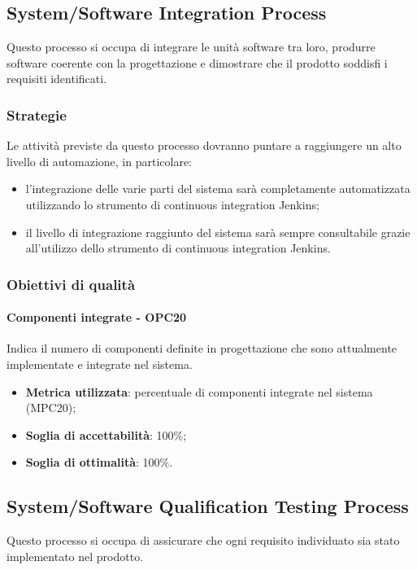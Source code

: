 \documentclass[PianoDiQualifica.tex]{subfiles}
\begin{document}
	\subsection{System/Software Integration Process}
		Questo processo si occupa di integrare le unità software tra loro, produrre software coerente con la progettazione e dimostrare che il
		prodotto soddisfi i requisiti identificati.
		
		\subsubsection{Strategie}
		Le attività previste da questo processo dovranno puntare a raggiungere un alto livello di automazione, in particolare:
		\begin{itemize}
			\item l’integrazione delle varie parti del sistema sarà completamente automatizzata utilizzando lo strumento di continuous integration Jenkins;
			\item il livello di integrazione raggiunto del sistema sarà sempre consultabile grazie all’utilizzo dello strumento di continuous integration Jenkins.
		\end{itemize}
		
		\subsubsection{Obiettivi di qualità}
			\paragraph{Componenti integrate - OPC20}
				Indica il numero di componenti definite in progettazione che sono attualmente implementate e integrate nel sistema.
				\begin{itemize}
					\item \textbf{Metrica utilizzata}: percentuale di componenti integrate nel sistema (MPC20);
					\item \textbf{Soglia di accettabilità}: 100\%;
					\item \textbf{Soglia di ottimalità}: 100\%.
				\end{itemize}
		
	\subsection{System/Software Qualification Testing Process}
		Questo processo si occupa di assicurare che ogni requisito individuato sia stato implementato nel prodotto. 
		
\end{document}
